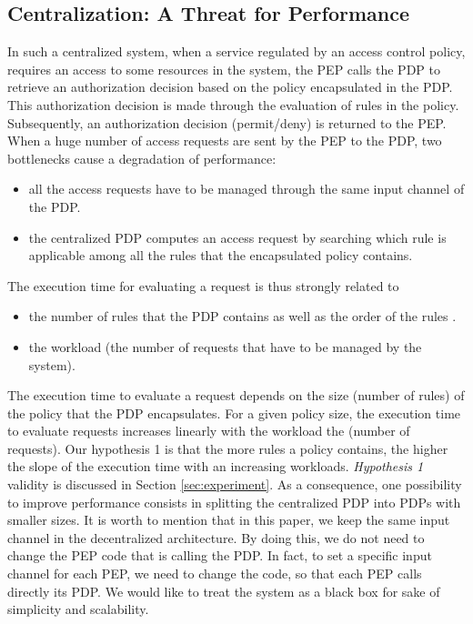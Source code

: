 \subsection{Centralization: A Threat for Performance}
In such a centralized system, when a service regulated by an access control policy, requires an access to some resources in the system, the PEP calls the PDP to 
retrieve an authorization decision based on the policy encapsulated in the PDP. This authorization decision is made through the evaluation of rules in the policy. 
Subsequently, an authorization decision (permit/deny) is returned to the PEP. When a huge number of access requests are sent by the PEP to the PDP, two bottlenecks cause a degradation of performance:
\begin{itemize}
 \item all the access requests have to be managed through the same input channel of the PDP. 
 \item the centralized PDP computes an access request by searching which rule is applicable among all the rules that the encapsulated policy contains.
\end{itemize}

The execution time for evaluating a request is thus strongly related to
\begin{itemize} 
\item the number of rules that the PDP contains as well as the order of the rules \cite{clustering}.
\item the workload (the number of requests that have to be managed by the system).
\end{itemize}
The execution time to evaluate a request depends on the size (number of rules) of the policy that the PDP encapsulates. For a given policy size, the execution time  to evaluate
 requests increases linearly with the workload the (number of requests). 
Our hypothesis 1 is that the more rules a policy contains, the higher the slope of the execution time with an increasing workloads. 
 \textit{Hypothesis 1} validity is discussed in Section \ref{sec:experiment}.
As a consequence, one possibility to improve performance consists in splitting the centralized PDP into PDPs with smaller sizes. 
It is worth to mention that in this paper, we keep the same input channel in the decentralized architecture. By doing this, we do not need to change the PEP code that is calling 
the PDP. In fact, to set a specific  input channel for each PEP, we need to change the code, so that each PEP calls directly its PDP. We would like to treat the system as
 a black box for sake of simplicity and scalability.  


